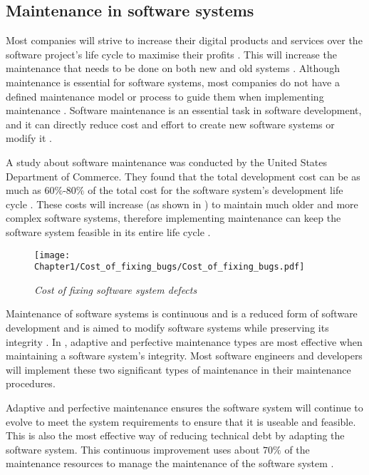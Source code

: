 \subsection{Maintenance in software systems}
Most companies will strive to increase their digital products and services over the software project's life cycle to maximise their profits \cite{Gralha2018}. This will increase the maintenance that needs to be done on both new and old systems \cite{Niu2018, Galster2019, Hasan2012}. Although maintenance is essential for software systems, most companies do not have a defined maintenance model or process to guide them when implementing maintenance \cite{Stojanov2017}. Software maintenance is an essential task in software development, and it can directly reduce cost and effort to create new software systems or modify it \cite{FrancisThamburaj2017}.\par A study about software maintenance was conducted by the United States Department of Commerce. They found that the total development cost can be as much as $60\%$-$80\%$ of the total cost for the software system's development life cycle \cite{Ogheneovo2014, Stark1996, Ackermann2009,Tang2010}. These costs will increase (as shown in ) to maintain much older and more complex software systems, therefore implementing maintenance can keep the software system feasible in its entire life cycle \cite{Alenezi2016, Booch1986}.

\begin{figure}[!htb] %
	\centering %
	\texttt{[image: Chapter1/Cost\_of\_fixing\_bugs/Cost\_of\_fixing\_bugs.pdf]}
	\caption[Cost of fixing software system defects]
	{\textit{Cost of fixing software system defects \cite{Ogheneovo2014}}}\label{fig:CH1_Costs_of_fixing_bugs}
\end{figure} 

Maintenance of software systems is continuous and is a reduced form of software development and is aimed to modify software systems while preserving its integrity \cite{Sneed2004,Ackermann2009,Port2017}. In , adaptive and perfective maintenance types are most effective when maintaining a software system's integrity. Most software engineers and developers will implement these two significant types of maintenance in their maintenance procedures.\par Adaptive and perfective maintenance ensures the software system will continue to evolve to meet the system requirements to ensure that it is useable and feasible. This is also the most effective way of reducing technical debt by adapting the software system. This continuous improvement uses about $70\%$ of the maintenance resources to manage the maintenance of the software system \cite{Kumar2013}. 

